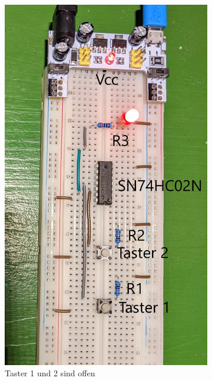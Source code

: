 \documentclass[
    paper=a4,
]{scrartcl}
\begin{document}
    \begin{figure}
        \centering
        \begin{subfigure}[t]{0.3\textwidth}
            \centering
            \includegraphics[width=0.9\linewidth]{Anhang/Bild3.1.jpg}
            \caption{Taster 1 und 2 sind offen}
        \end{subfigure}\hfill%
        \begin{subfigure}[t]{0.3\textwidth}
            \centering

\end{subfigure}
\end{figure}
\end{document}
